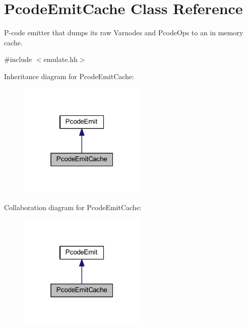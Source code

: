 \hypertarget{class_pcode_emit_cache}{}\section{Pcode\+Emit\+Cache Class Reference}
\label{class_pcode_emit_cache}


P-\/code emitter that dumps its raw Varnodes and Pcode\+Ops to an in memory cache.  




{\ttfamily \#include $<$emulate.\+hh$>$}



Inheritance diagram for Pcode\+Emit\+Cache\+:
\nopagebreak
\begin{figure}[H]
\begin{center}
\leavevmode
\includegraphics[width=172pt]{class_pcode_emit_cache__inherit__graph}
\end{center}
\end{figure}


Collaboration diagram for Pcode\+Emit\+Cache\+:
\nopagebreak
\begin{figure}[H]
\begin{center}
\leavevmode
\includegraphics[width=172pt]{class_pcode_emit_cache__coll__graph}
\end{center}
\end{figure}
